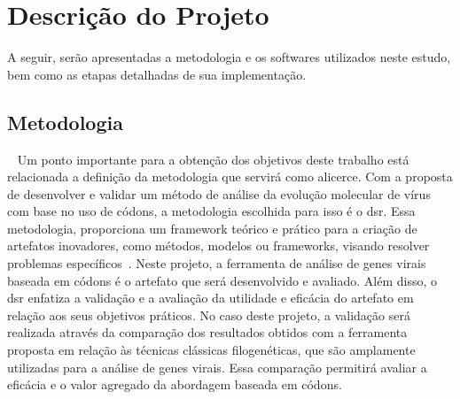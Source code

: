 
\chapter{Descrição do Projeto}




A seguir, serão apresentadas a metodologia e os softwares utilizados neste estudo, bem como as etapas detalhadas de sua implementação.

\section{Metodologia}~\label{sec:metodologia}
Um ponto importante para a obtenção dos objetivos deste trabalho está relacionada a definição da metodologia que servirá como alicerce. Com a proposta de desenvolver e validar um método de análise da evolução molecular de vírus com base no uso de códons, a metodologia escolhida para isso é o \gls{dsr}. Essa metodologia, proporciona um framework teórico e prático para a criação de artefatos inovadores, como métodos, modelos ou frameworks, visando resolver problemas específicos~\cite{peffers_dsr_2007}. Neste projeto, a ferramenta de análise de genes virais baseada em códons é o artefato que será desenvolvido e avaliado. Além disso, o \gls{dsr} enfatiza a validação e a avaliação da utilidade e eficácia do artefato em relação aos seus objetivos práticos. No caso deste projeto, a validação será realizada através da comparação dos resultados obtidos com a ferramenta proposta em relação às técnicas clássicas filogenéticas, que são amplamente utilizadas para a análise de genes virais. Essa comparação permitirá avaliar a eficácia e o valor agregado da abordagem baseada em códons.

